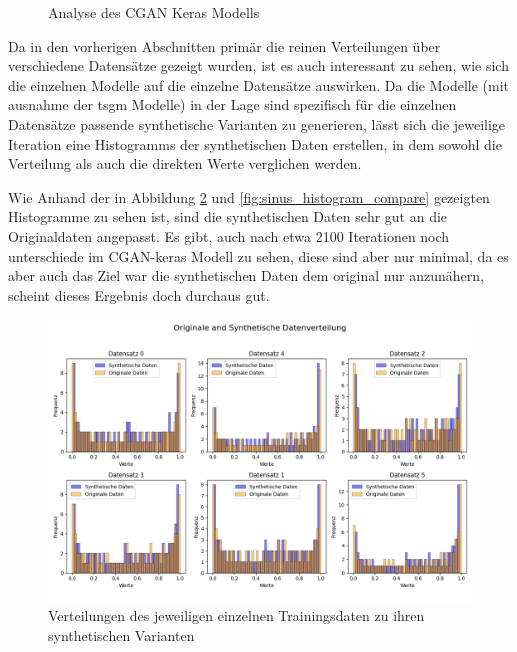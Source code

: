 \begin{figure}[ht]
\begin{minipage}{0.5\textwidth}
        \caption{Analyse des CGAN Keras Modells}
        \label{fig:graphs_cgan_keras_analysis}
    \end{minipage}
\end{figure}




Da in den vorherigen Abschnitten primär die reinen Verteilungen über verschiedene Datensätze gezeigt wurden, ist es auch interessant zu sehen, wie sich die einzelnen Modelle auf die einzelne Datensätze auswirken.
Da die Modelle (mit ausnahme der tsgm Modelle) in der Lage sind spezifisch für die einzelnen Datensätze passende synthetische Varianten zu generieren, lässt sich die jeweilige Iteration eine Histogramms der synthetischen Daten erstellen, in dem sowohl die Verteilung als auch die direkten Werte verglichen werden.

Wie Anhand der in Abbildung \ref{fig:sinus_histogram} und \ref{fig:sinus_histogram_compare} gezeigten Histogramme zu sehen ist, sind die synthetischen Daten sehr gut an die Originaldaten angepasst. Es gibt, auch nach etwa 2100 Iterationen noch unterschiede im CGAN-keras Modell zu sehen, diese sind aber nur minimal, da es aber auch  das Ziel war die synthetischen Daten dem original nur anzunähern, scheint dieses Ergebnis doch durchaus gut.
\begin{figure}[ht]
    \centering
    \includegraphics[width=1\textwidth]{includes/figures/graphs/sinus_plot_histogram.png}
    \caption{Verteilungen des jeweiligen einzelnen Trainingsdaten zu ihren synthetischen Varianten}
    \label{fig:sinus_histogram}
\end{figure}


